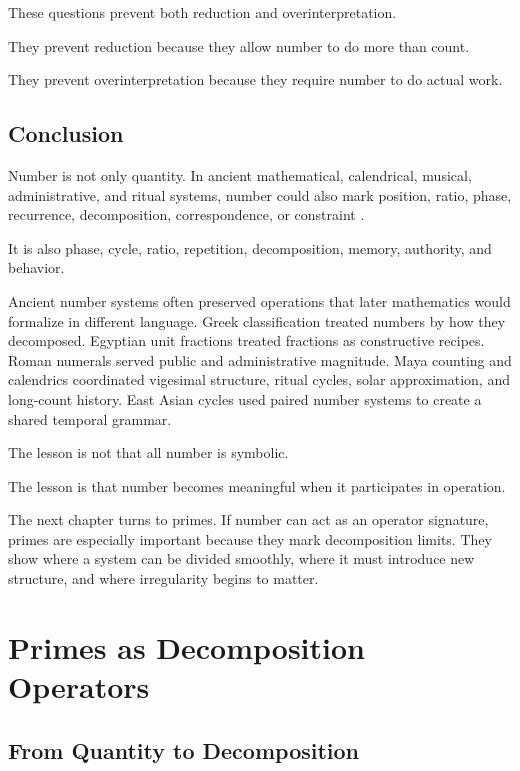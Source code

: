 \documentclass[11pt]{book}
\begin{document}
These questions prevent both reduction and overinterpretation.

They prevent reduction because they allow number to do more than count.

They prevent overinterpretation because they require number to do actual work.

\section{Conclusion}

Number is not only quantity. In ancient mathematical, calendrical, musical, administrative, and ritual systems, number could also mark position, ratio, phase, recurrence, decomposition, correspondence, or constraint \cite{Neugebauer1957ExactSciences,Heath1921GreekMathematics,Robson2008MathematicsAncientIraq,Clagett1989AncientEgyptianScience1}.

It is also phase, cycle, ratio, repetition, decomposition, memory, authority, and behavior.

Ancient number systems often preserved operations that later mathematics would formalize in different language. Greek classification treated numbers by how they decomposed. Egyptian unit fractions treated fractions as constructive recipes. Roman numerals served public and administrative magnitude. Maya counting and calendrics coordinated vigesimal structure, ritual cycles, solar approximation, and long-count history. East Asian cycles used paired number systems to create a shared temporal grammar.

The lesson is not that all number is symbolic.

The lesson is that number becomes meaningful when it participates in operation.

The next chapter turns to primes. If number can act as an operator signature, primes are especially important because they mark decomposition limits. They show where a system can be divided smoothly, where it must introduce new structure, and where irregularity begins to matter.

\chapter{Primes as Decomposition Operators}

\section{From Quantity to Decomposition}
\end{document}
